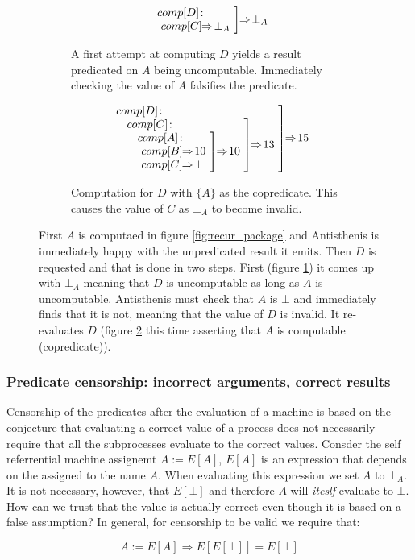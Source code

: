 \begin{figure}[H]
  \begin{subfigure}{0.4\linewidth}
    \[
      \comp{\bot_A}{D}{comp[C] \ev \bot_A}
    \]
    \caption{\label{fig:compdnaive}A first attempt at computing \(D\)
      yields a result predicated on \(A\) being
      uncomputable. Immediately checking the value of \(A\) falsifies
      the predicate.}
  \end{subfigure}
  \begin{subfigure}{0.4\linewidth}
    \[
    \comp{15}{D}{
      \comp{13}{C}{
        \comp{10}{A}{
          comp[B] \ev 10 \\
          \ comp[C] \ev \bot}}}
  \]
  \caption{\label{fig:compdsmart}Computation for \(D\) with \(\{A\}\)
    as the copredicate. This causes the value of \(C\) as \(\bot_A\)
    to become invalid.}
  \end{subfigure}
  \caption{\label{fig:correct} First \(A\) is computaed in figure
    \ref{fig:recur_package} and Antisthenis is immediately happy with
    the unpredicated result it emits. Then \(D\) is requested and that
    is done in two steps. First (figure \ref{fig:compdnaive}) it comes
    up with \(\bot_A\) meaning that \(D\) is uncomputable as long as
    \(A\) is uncomputable. Antisthenis must check that \(A\) is
    \(\bot\) and immediately finds that it is not, meaning that the
    value of \(D\) is invalid. It re-evaluates \(D\) (figure
    \ref{fig:compdsmart} this time asserting that \(A\) is computable
    (copredicate)).}
\end{figure}

\subsubsection{Predicate censorship: incorrect arguments, correct
  results}

Censorship of the predicates after the evaluation of a machine is
based on the conjecture that evaluating a correct value of a process
does not necessarily require that all the subprocesses evaluate to the
correct values. Consder the self referrential machine assignemt \(A :=
E[A]\), \(E[A]\) is an expression that depends on the assigned to the
name \(A\). When evaluating this expression we set \(A\) to
\(\bot_A\). It is not necessary, however, that \(E[\bot]\) and
therefore \(A\) will \emph{iteslf} evaluate to \(\bot\). How can we trust
that the value is actually correct even though it is based on a false
assumption? In general, for censorship to be valid we require that:

\[
A := E[A] \Rightarrow E[E[\bot]] = E[\bot]
\]

